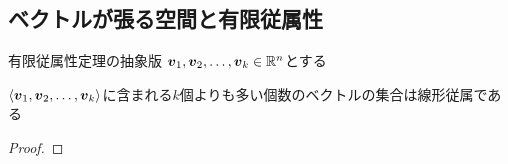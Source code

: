 \documentclass[../../../topic_linear-algebra]{subfiles}
\begin{document}
\subsection{ベクトルが張る空間と有限従属性}

\begin{theorem}{有限従属性定理の抽象版}\label{thm:abstract-finite-dependency}
  $\vb*{v}_1, \vb*{v}_2, \dots, \vb*{v}_k \in \mathbb{R}^n$とする

  $\langle \vb*{v}_1, \vb*{v}_2, \dots, \vb*{v}_k \rangle$に含まれる$k$個よりも多い個数のベクトルの集合は線形従属である
\end{theorem}

\begin{proof}
\end{proof}
\end{document}
